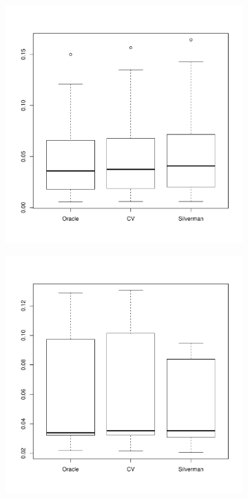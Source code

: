 \begin{figure}[htbp]
    \centering
    \begin{subfigure}[t]{0.45\textwidth}
        \includegraphics[width=\textwidth]{results/by_overall/relative-centroid-drift-boxplot}
        \label{fig:discussion:overall_centroiddrift_boxplot:unif}
    \end{subfigure}
    \begin{subfigure}[t]{0.45\textwidth}
        \includegraphics[width=\textwidth]{results/by_overall/relative-centroid-drift-peakpop-boxplot}

\end{subfigure}
\end{figure}
